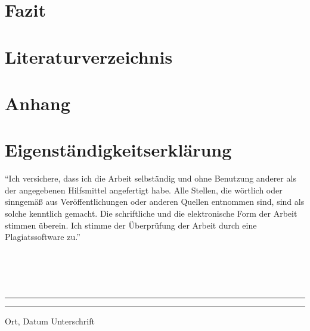 \documentclass[12pt, a4paper, oneside]{article}
\begin{document}
\section{Fazit}

\section{Literaturverzeichnis}

\renewcommand{\refname}{} 


\newpage


\appendix %
\section{Anhang}

\newpage

\section{Eigenständigkeitserklärung}
``Ich versichere, dass ich die Arbeit selbständig und ohne Benutzung anderer als der angegebenen Hilfsmittel angefertigt habe. Alle Stellen, die wörtlich oder sinngemäß aus Veröffentlichungen oder anderen Quellen entnommen sind, sind als solche kenntlich gemacht. Die schriftliche und die elektronische Form der Arbeit stimmen überein. Ich stimme der Überprüfung der Arbeit durch eine Plagiatssoftware zu.''
\paragraph{}$~~$\\
\paragraph{}$~~$\\
\vspace{50pt} 
\noindent\rule{5cm}{.4pt}\hfill\rule{5cm}{.4pt}\par 
\noindent Ort, Datum \hfill Unterschrift 
\end{document}
